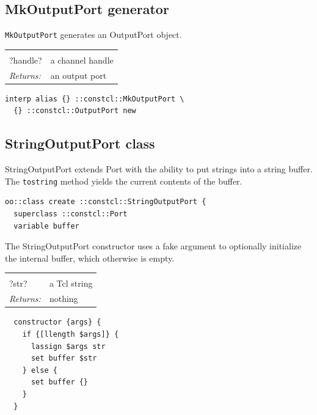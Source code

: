 \documentclass[twoside]{report}
\begin{document}
\subsection{MkOutputPort generator}
\label{mkoutputport-generator}

\texttt{MkOutputPort} generates an OutputPort object.

\noindent\begin{tabular}{ |p{1.9cm} p{8cm}| }
\hline
\rowcolor[HTML]{CCCCCC} \multicolumn{2}{|l|}{\bf MkOutputPort (internal)} \\
?handle? & a channel handle \\
\textit{Returns:} & an output port \\
\hline
\end{tabular}

\begin{lstlisting}
interp alias {} ::constcl::MkOutputPort \
  {} ::constcl::OutputPort new
\end{lstlisting}

\subsection{StringOutputPort class}
\label{stringoutputport-class}

StringOutputPort extends Port with the ability to put strings into a string buffer. The \texttt{tostring} method yields the current contents of the buffer.

\begin{lstlisting}
oo::class create ::constcl::StringOutputPort {
  superclass ::constcl::Port
  variable buffer
\end{lstlisting}

The StringOutputPort constructor uses a fake argument to optionally initialize the internal buffer, which otherwise is empty.

\noindent\begin{tabular}{ |p{1.9cm} p{8cm}| }
\hline
\rowcolor[HTML]{CCCCCC} \multicolumn{2}{|l|}{\bf StringOutputPort constructor (internal)} \\
?str? & a Tcl string \\
\textit{Returns:} & nothing \\
\hline
\end{tabular}

\begin{lstlisting}
  constructor {args} {
    if {[llength $args]} {
      lassign $args str
      set buffer $str
    } else {
      set buffer {}
    }
  }
\end{lstlisting}
\end{document}
